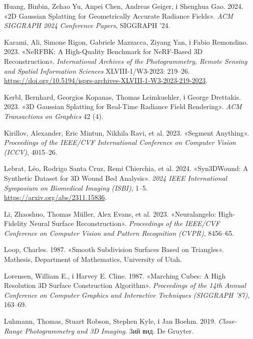\documentclass[
  ukrainian,
  10pt,
  a4paper,
  twocolumn]{article}
\newlength{\cslhangindent}
\newenvironment{CSLReferences}[2] %
 {\begin{list}{}{%
  \setlength{\itemindent}{0pt}
  \setlength{\leftmargin}{0pt}
  \setlength{\parsep}{0pt}
  \ifodd #1
   \setlength{\leftmargin}{\cslhangindent}
   \setlength{\itemindent}{-1\cslhangindent}
  \fi
  \setlength{\itemsep}{#2\baselineskip}}}
 {\end{list}}
\begin{document}
\begin{CSLReferences}{1}{1}
Huang, Binbin, Zehao Yu, Anpei Chen, Andreas Geiger, і Shenghua Gao.
2024. {«{2D Gaussian Splatting} for Geometrically Accurate Radiance
Fields»}. \emph{ACM SIGGRAPH 2024 Conference Papers}, SIGGRAPH '24.

Karami, Ali, Simone Rigon, Gabriele Mazzacca, Ziyang Yan, і Fabio
Remondino. 2023. {«{NeRFBK}: A High-Quality Benchmark for {NeRF}-Based
{3D} Reconstruction»}. \emph{International Archives of the
Photogrammetry, Remote Sensing and Spatial Information Sciences}
XLVIII-1/W3-2023: 219--26.
\url{https://doi.org/10.5194/isprs-archives-XLVIII-1-W3-2023-219-2023}.

Kerbl, Bernhard, Georgios Kopanas, Thomas Leimkuehler, і George
Drettakis. 2023. {«{3D Gaussian Splatting} for Real-Time Radiance Field
Rendering»}. \emph{ACM Transactions on Graphics} 42 (4).

Kirillov, Alexander, Eric Mintun, Nikhila Ravi, et al. 2023. {«Segment
Anything»}. \emph{Proceedings of the IEEE/CVF International Conference
on Computer Vision (ICCV)}, 4015--26.

{Lebrat, Léo, Rodrigo Santa Cruz, Remi Chierchia, et al.} 2024.
{«{Syn3DWound}: A Synthetic Dataset for {3D} Wound Bed Analysis»}.
\emph{2024 IEEE International Symposium on Biomedical Imaging (ISBI)},
1--5. \url{https://arxiv.org/abs/2311.15836}.

Li, Zhaoshuo, Thomas Müller, Alex Evans, et al. 2023. {«Neuralangelo:
High-Fidelity Neural Surface Reconstruction»}. \emph{Proceedings of the
IEEE/CVF Conference on Computer Vision and Pattern Recognition (CVPR)},
8456--65.

Loop, Charles. 1987. {«Smooth Subdivision Surfaces Based on Triangles»}.
Mathesis, Department of Mathematics, University of Utah.

Lorensen, William E., і Harvey E. Cline. 1987. {«Marching Cubes: A High
Resolution {3D} Surface Construction Algorithm»}. \emph{Proceedings of
the 14th Annual Conference on Computer Graphics and Interactive
Techniques (SIGGRAPH '87)}, 163--69.

Luhmann, Thomas, Stuart Robson, Stephen Kyle, і Jan Boehm. 2019.
\emph{Close-Range Photogrammetry and {3D} Imaging}. 3ий вид. De Gruyter.


\end{CSLReferences}
\end{document}
